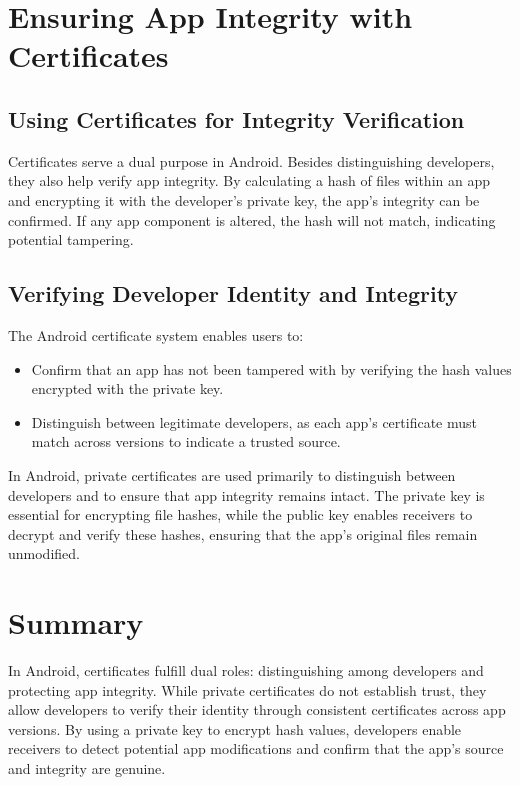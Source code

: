 \documentclass{article}
\begin{document}
\section{Ensuring App Integrity with Certificates}
\subsection{Using Certificates for Integrity Verification}
Certificates serve a dual purpose in Android. Besides distinguishing developers, they also help verify app integrity. By calculating a hash of files within an app and encrypting it with the developer’s private key, the app’s integrity can be confirmed. If any app component is altered, the hash will not match, indicating potential tampering.

\subsection{Verifying Developer Identity and Integrity}
The Android certificate system enables users to:
\begin{itemize}
    \item Confirm that an app has not been tampered with by verifying the hash values encrypted with the private key.
    \item Distinguish between legitimate developers, as each app’s certificate must match across versions to indicate a trusted source.
\end{itemize}

In Android, private certificates are used primarily to distinguish between developers and to ensure that app integrity remains intact. The private key is essential for encrypting file hashes, while the public key enables receivers to decrypt and verify these hashes, ensuring that the app’s original files remain unmodified.

\section{Summary}
In Android, certificates fulfill dual roles: distinguishing among developers and protecting app integrity. While private certificates do not establish trust, they allow developers to verify their identity through consistent certificates across app versions. By using a private key to encrypt hash values, developers enable receivers to detect potential app modifications and confirm that the app's source and integrity are genuine.
\end{document}
